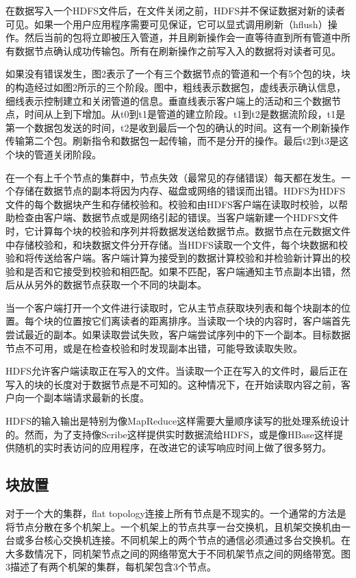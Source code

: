 在数据写入一个HDFS文件后，在文件关闭之前，HDFS并不保证数据对新的读者可见。如果一个用户应用程序需要可见保证，它可以显式调用刷新（hflush）操作。然后当前的包将立即被压入管道，并且刷新操作会一直等待直到所有管道中所有数据节点确认成功传输包。所有在刷新操作之前写入入的数据将对读者可见。

如果没有错误发生，图2表示了一个有三个数据节点的管道和一个有5个包的块，块的构造经过如图2所示的三个阶段。图中，粗线表示数据包，虚线表示确认信息，细线表示控制建立和关闭管道的信息。垂直线表示客户端上的活动和三个数据节点，时间从上到下增加。从t0到t1是管道的建立阶段。t1到t2是数据流阶段，t1是第一个数据包发送的时间，t2是收到最后一个包的确认的时间。这有一个刷新操作传输第二个包。刷新指令和数据包一起传输，而不是分开的操作。最后t2到t3是这个块的管道关闭阶段。

在一个有上千个节点的集群中，节点失效（最常见的存储错误）每天都在发生。一个存储在数据节点的副本将因为内存、磁盘或网络的错误而出错。HDFS为HDFS文件的每个数据块产生和存储校验和。校验和由HDFS客户端在读取时校验，以帮助检查由客户端、数据节点或是网络引起的错误。当客户端新建一个HDFS文件时，它计算每个块的校验和序列并将数据发送给数据节点。数据节点在元数据文件中存储校验和，和块数据文件分开存储。当HDFS读取一个文件，每个块数据和校验和将传送给客户端。客户端计算为接受到的数据计算校验和并检验新计算出的校验和是否和它接受到校验和相匹配。如果不匹配，客户端通知主节点副本出错，然后从从另外的数据节点获取一个不同的块副本。

当一个客户端打开一个文件进行读取时，它从主节点获取块列表和每个块副本的位置。每个块的位置按它们离读者的距离排序。当读取一个块的内容时，客户端首先尝试最近的副本。如果读取尝试失败，客户端尝试序列中的下一个副本。目标数据节点不可用，或是在检查校验和时发现副本出错，可能导致读取失败。

HDFS允许客户端读取正在写入的文件。当读取一个正在写入的文件时，最后正在写入的块的长度对于数据节点是不可知的。这种情况下，在开始读取内容之前，客户向一个副本端请求最新的长度。

HDFS的输入输出是特别为像MapReduce这样需要大量顺序读写的批处理系统设计的。然而，为了支持像Scribe这样提供实时数据流给HDFS，或是像HBase这样提供随机的实时表访问的应用程序，在改进它的读写响应时间上做了很多努力。

\subsection{块放置}

对于一个大的集群，flat topology连接上所有节点是不现实的。一个通常的方法是将节点分散在多个机架上。一个机架上的节点共享一台交换机，且机架交换机由一台或多台核心交换机连接。不同机架上的两个节点的通信必须通过多台交换机。在大多数情况下，同机架节点之间的网络带宽大于不同机架节点之间的网络带宽。图3描述了有两个机架的集群，每机架包含3个节点。

